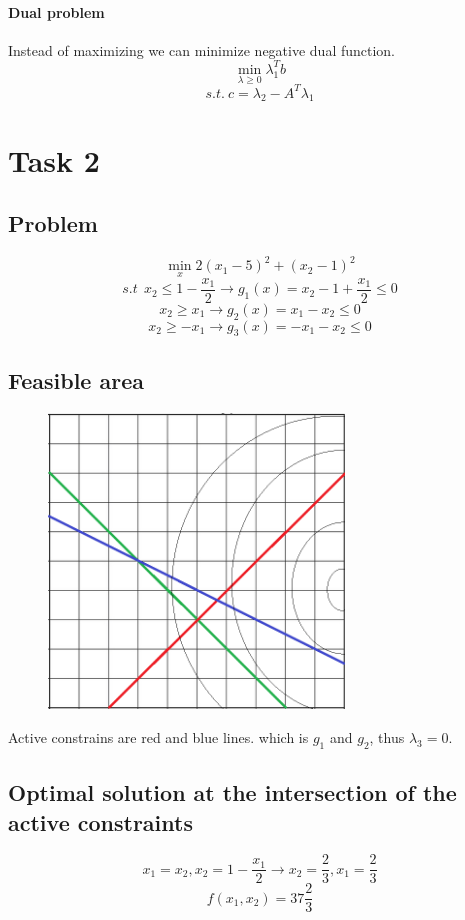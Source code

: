 \documentclass[12pt]{article}
\begin{document}
\paragraph{Dual problem}
Instead of maximizing we can minimize negative dual function. 
\[\min_{\lambda \geq 0} \lambda_1 ^T b\]
\[s.t. \ c=\lambda_2 - A^T \lambda_1\]


\newpage
\section{Task 2}
\subsection{Problem}
\[\min_x 2(x_1-5)^2+(x_2-1)^2\]
\[s.t \ \ x_2 \leq 1- \frac{x_1}{2} \longrightarrow g_1(x)=x_2-1
+\frac{x_1}{2} \leq 0 \]
\[x_2 \geq x_1 \longrightarrow g_2(x)=x_1-x_2 \leq 0 \]
\[x_2 \geq - x_1 \longrightarrow g_3(x)=-x_1-x_2 \leq 0 \]

\subsection{Feasible area}
\begin{figure}[h]
\centering
\includegraphics[width=0.7\textwidth]{pics/feas}
\end{figure}
Active constrains are red and blue lines. which is $g_1$ and $g_2$, thus $\lambda_3 = 0$.

\subsection{Optimal solution at the intersection of the active constraints}
\[x_1=x_2 , x_2=1-\frac{x_1}{2} \longrightarrow x_2 = \frac{2}{3}, x_1=\frac{2}{3} \]
\[f(x_1,x_2) = 37 \frac{2}{3} \]
\end{document}
